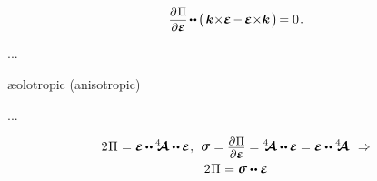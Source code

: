 \begin{otherlanguage}{russian}
\nopagebreak\vspace{-0.2em}\begin{equation}
\scalebox{.9}{$ \displaystyle\frac{\partial\hspace{.2ex}\potential}{\partial\infinitesimaldeformation} $} \hspace{-.2ex} \dotdotp \hspace{-.2ex}
\bigl(\hspace{.3ex}
\bm{k} \hspace{-.5ex} \times \hspace{-.5ex} \infinitesimaldeformation \hspace{-.2ex} - \hspace{-.2ex} \infinitesimaldeformation \hspace{-.5ex} \times \hspace{-.5ex} \bm{k}
\hspace{.3ex}\bigr) \hspace{-.3ex} = 0
\hspace{.2ex} .
\end{equation}

...

æolotropic (anisotropic)

...

\begin{equation}\label{potentialenergydensityfromstressandstrain}
\begin{gathered}[b]
2 \hspace{.1ex} \potential \hspace{.1ex}
= \infinitesimaldeformation \hspace{-0.1ex} \dotdotp \hspace{-0.1ex} \stiffnesstensor \dotdotp \hspace{-0.1ex} \infinitesimaldeformation
\hspace{.1ex} ,
\hspace{.4em}
\linearstress \hspace{.1ex} = \scalebox{.9}{$\displaystyle\frac{\raisemath{-0.2em}{\partial\hspace{.1ex} \potential}}{\raisemath{.04em}{\partial \infinitesimaldeformation}}$} = \stiffnesstensor \dotdotp \hspace{-0.1ex} \infinitesimaldeformation = \infinitesimaldeformation \dotdotp \stiffnesstensor
\hspace{.4em}\Rightarrow
\\[-0.1em]
%
2 \hspace{.1ex} \potential \hspace{.1ex} = \linearstress \dotdotp \infinitesimaldeformation
\end{gathered}
\end{equation}


\end{otherlanguage}
